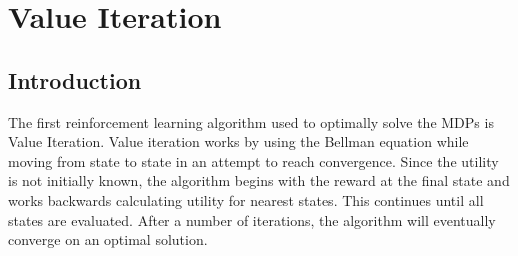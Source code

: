 \documentclass[h]{article}
\begin{document}
\section*{Value Iteration}
\subsection*{Introduction}
The first reinforcement learning algorithm used to optimally solve the MDPs is Value Iteration. 
 Value iteration works by using the Bellman equation while moving from 
 state to state in an attempt to reach convergence.  Since the utility is not 
 initially known, the algorithm begins with the reward at the final state and works 
 backwards calculating utility for nearest states.  This continues 
 until all states are evaluated.  After a number of iterations, the algorithm 
 will eventually converge on an optimal solution.
 
\end{document}
